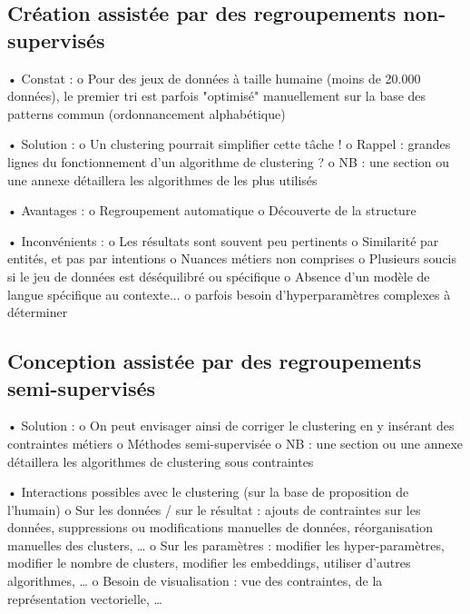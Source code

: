         \subsection{Création assistée par des regroupements non-supervisés}

            •	Constat :
                o	Pour des jeux de données à taille humaine (moins de 20.000 données), le premier tri est parfois "optimisé" manuellement sur la base des patterns commun (ordonnancement alphabétique)

            •	Solution :
                o	Un clustering pourrait simplifier cette tâche !
                o   Rappel : grandes lignes du fonctionnement d'un algorithme de \gls{clustering} ?
                o	NB : une section ou une annexe détaillera les algorithmes de  les plus utilisés

            •	Avantages :
                o	Regroupement automatique
                o	Découverte de la structure

            •	Inconvénients :
                o	Les résultats sont souvent peu pertinents
                o	Similarité par entités, et pas par intentions
                o	Nuances métiers non comprises
                o	Plusieurs soucis si le jeu de données est déséquilibré ou spécifique
                o	Absence d’un modèle de langue spécifique au contexte...
                o   parfois besoin d'hyperparamètres complexes à déterminer

        \subsection{Conception assistée par des regroupements semi-supervisés}

            •	Solution :
                o	On peut envisager ainsi de corriger le clustering en y insérant des contraintes métiers\hspace{2em}
                \cite{lampert:2018}
                o	Méthodes semi-supervisée
                o	NB : une section ou une annexe détaillera les algorithmes de clustering sous contraintes

            •   Interactions possibles avec le clustering (sur la base de proposition de l'humain)
                o	Sur les données / sur le résultat : ajouts de contraintes sur les données, suppressions ou modifications manuelles de données, réorganisation manuelles des clusters, …
                o	Sur les paramètres : modifier les hyper-paramètres, modifier le nombre de clusters, modifier les embeddings, utiliser d’autres algorithmes, …
                o	Besoin de visualisation : vue des contraintes, de la représentation vectorielle, …

